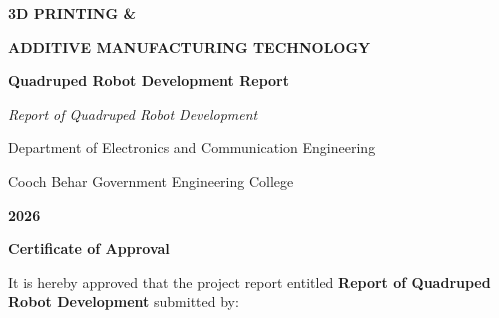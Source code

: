 \documentclass[12pt, a4paper]{article}
\begin{document}

\begin{titlepage}
\thispagestyle{empty}
\centering
\vspace*{2cm}
{\Huge\bfseries\color{myred} 3D PRINTING \&\par}
\vspace{0.3cm}
{\Huge\bfseries\color{myred} ADDITIVE MANUFACTURING TECHNOLOGY\par}
\vspace{0.8cm}
{\Large\bfseries\color{myblue} Quadruped Robot Development Report\par}
\vspace{0.5cm}
{\large\color{myamber}\textit{Report of Quadruped Robot Development}\par}
\vspace{1cm}
\vspace{10cm}   %
\vfill
{\large Department of Electronics and Communication Engineering\par}
{\large Cooch Behar Government Engineering College\par}
\vspace{0.3cm}
{\large\bfseries 2026\par}
\end{titlepage}

\newpage
\thispagestyle{plain}

\begin{center}
  {\Large\bfseries\color{myred} Certificate of Approval\par}
\end{center}

\vspace{0.8cm}

It is hereby approved that the project report entitled
\textbf{Report of Quadruped Robot Development} submitted by:
\end{document}
